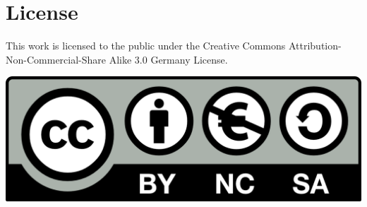 \documentclass[a4paper,
    11pt,
    normalheadings,
    parindent,
    UKenglish,
    abstracton,
    ]{scrartcl}
\begin{document}
\section*{License}
This work is licensed to the public under the Creative Commons Attribution-Non-Commercial-Share Alike 3.0 Germany License.
\begin{center}\includegraphics{bin/by-nc-sa-eu.png}\end{center}
\end{document}
